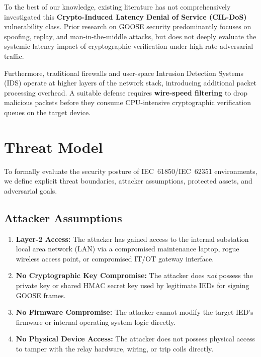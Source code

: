 \documentclass[12pt,a4paper]{article}
\begin{document}
To the best of our knowledge, existing literature has not comprehensively investigated this \textbf{Crypto-Induced Latency Denial of Service (CIL-DoS)} vulnerability class. Prior research on GOOSE security predominantly focuses on spoofing, replay, and man-in-the-middle attacks, but does not deeply evaluate the systemic latency impact of cryptographic verification under high-rate adversarial traffic.

Furthermore, traditional firewalls and user-space Intrusion Detection Systems (IDS) operate at higher layers of the network stack, introducing additional packet processing overhead. A suitable defense requires \textbf{wire-speed filtering} to drop malicious packets before they consume CPU-intensive cryptographic verification queues on the target device.

\section{Threat Model}

To formally evaluate the security posture of IEC~61850/IEC~62351 environments, we define explicit threat boundaries, attacker assumptions, protected assets, and adversarial goals.

\subsection{Attacker Assumptions}
\begin{enumerate}[noitemsep]
  \item \textbf{Layer-2 Access:} The attacker has gained access to the internal substation local area network (LAN) via a compromised maintenance laptop, rogue wireless access point, or compromised IT/OT gateway interface.
  \item \textbf{No Cryptographic Key Compromise:} The attacker does \emph{not} possess the private key or shared HMAC secret key used by legitimate IEDs for signing GOOSE frames.
  \item \textbf{No Firmware Compromise:} The attacker cannot modify the target IED's firmware or internal operating system logic directly.
  \item \textbf{No Physical Device Access:} The attacker does not possess physical access to tamper with the relay hardware, wiring, or trip coils directly.
\end{enumerate}
\end{document}
